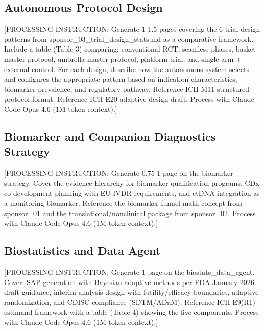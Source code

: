 \subsection{Autonomous Protocol Design}

[PROCESSING INSTRUCTION: Generate 1-1.5 pages covering the 6 trial design patterns
from sponsor\_03\_trial\_design\_stats.md as a comparative framework. Include a table
(Table 3) comparing: conventional RCT, seamless phases, basket master protocol, umbrella
master protocol, platform trial, and single-arm + external control. For each design,
describe how the autonomous system selects and configures the appropriate pattern
based on indication characteristics, biomarker prevalence, and regulatory pathway.
Reference ICH M11 structured protocol format. Reference ICH E20 adaptive design draft.
Process with Claude Code Opus 4.6 (1M token context).]

\subsection{Biomarker and Companion Diagnostics Strategy}

[PROCESSING INSTRUCTION: Generate 0.75-1 page on the biomarker strategy. Cover the
evidence hierarchy for biomarker qualification programs, CDx co-development planning
with EU IVDR requirements, and ctDNA integration as a monitoring biomarker. Reference
the biomarker funnel math concept from sponsor\_01 and the translational/nonclinical
package from sponsor\_02. Process with Claude Code Opus 4.6 (1M token context).]

\subsection{Biostatistics and Data Agent}

[PROCESSING INSTRUCTION: Generate 1 page on the biostats\_data\_agent. Cover: SAP
generation with Bayesian adaptive methods per FDA January 2026 draft guidance,
interim analysis design with futility/efficacy boundaries, adaptive randomization,
and CDISC compliance (SDTM/ADaM). Reference ICH E9(R1) estimand framework with
a table (Table 4) showing the five components. Process with Claude Code Opus 4.6
(1M token context).]
